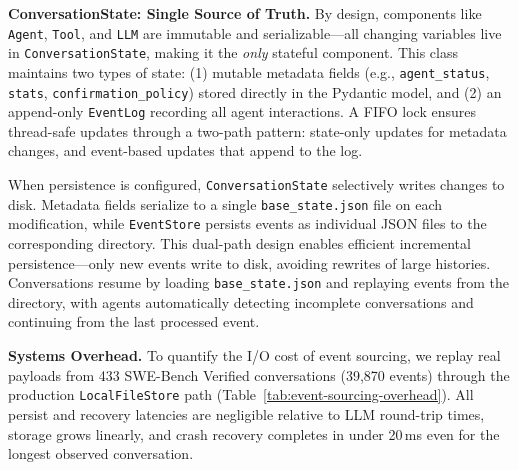 \textbf{ConversationState: Single Source of Truth.}
By design, components like \texttt{Agent}, \texttt{Tool}, and \texttt{LLM} are immutable and serializable—all changing variables live in \texttt{ConversationState}, making it the \textit{only} stateful component. This class maintains two types of state: (1) mutable metadata fields (e.g., \texttt{agent\_status}, \texttt{stats}, \texttt{confirmation\_policy}) stored directly in the Pydantic model, and (2) an append-only \texttt{EventLog} recording all agent interactions. A FIFO lock ensures thread-safe updates through a two-path pattern: state-only updates for metadata changes, and event-based updates that append to the log.

When persistence is configured, \texttt{ConversationState} selectively writes changes to disk. Metadata fields serialize to a single \texttt{base\_state.json} file on each modification, while \texttt{EventStore} persists events as individual JSON files to the corresponding directory. This dual-path design enables efficient incremental persistence—only new events write to disk, avoiding rewrites of large histories. Conversations resume by loading \texttt{base\_state.json} and replaying events from the directory, with agents automatically detecting incomplete conversations and continuing from the last processed event.

\textbf{Systems Overhead.}
To quantify the I/O cost of event sourcing, we replay real payloads from 433 SWE-Bench Verified conversations (39,870 events) through the production \texttt{LocalFileStore} path (Table~\ref{tab:event-sourcing-overhead}). All persist and recovery latencies are negligible relative to LLM round-trip times, storage grows linearly, and crash recovery completes in under 20\,ms even for the longest observed conversation.

\begin{table}[!h]
\centering
\caption{Event-sourcing systems overhead measured on SWE-Bench Verified traces (433 conversations, 39,870 events).}
\label{tab:event-sourcing-overhead}
\end{table}

